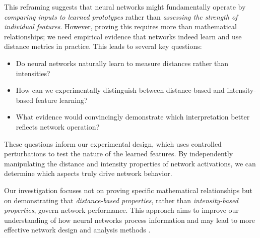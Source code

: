 This reframing suggests that neural networks might fundamentally operate by \emph{comparing inputs to learned prototypes} rather than \emph{assessing the strength of individual features}. However, proving this requires more than mathematical relationships; we need empirical evidence that networks indeed learn and use distance metrics in practice. This leads to several key questions:

\begin{itemize}
    \item Do neural networks naturally learn to measure distances rather than intensities?
    \item How can we experimentally distinguish between distance-based and intensity-based feature learning?
    \item What evidence would convincingly demonstrate which interpretation better reflects network operation?
\end{itemize}

These questions inform our experimental design, which uses controlled perturbations to test the nature of the learned features. By independently manipulating the distance and intensity properties of network activations, we can determine which aspects truly drive network behavior.

Our investigation focuses not on proving specific mathematical relationships but on demonstrating that \emph{distance-based properties}, rather than \emph{intensity-based properties}, govern network performance. This approach aims to improve our understanding of how neural networks process information and may lead to more effective network design and analysis methods \citep{montavon2018methods, samek2019explainable}.